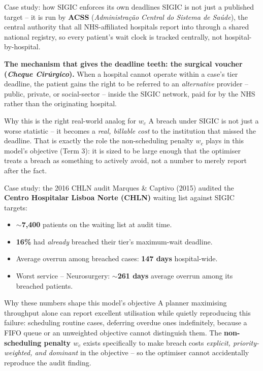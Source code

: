 \documentclass[10pt,aspectratio=169]{beamer}
\begin{document}
\begin{frame}{Case study: how SIGIC enforces its own deadlines}
  SIGIC is not just a published target -- it is run by \textbf{ACSS}
  (\emph{Administra\c{c}\~ao Central do Sistema de Sa\'ude}), the central
  authority that all NHS-affiliated hospitals report into through a shared
  national registry, so every patient's wait clock is tracked centrally,
  not hospital-by-hospital.

  \vspace{0.4em}
  \textbf{The mechanism that gives the deadline teeth: the surgical
  voucher (\emph{Cheque Cirúrgico}).} When a hospital cannot operate
  within a case's tier deadline, the patient gains the right to be
  referred to an \emph{alternative} provider -- public, private, or
  social-sector -- inside the SIGIC network, paid for by the NHS rather
  than the originating hospital.

  \pause
  \begin{block}{Why this is the right real-world analog for $w_c$}
    A breach under SIGIC is not just a worse statistic -- it becomes a
    \emph{real, billable cost} to the institution that missed the
    deadline. That is exactly the role the non-scheduling penalty $w_c$
    plays in this model's objective (Term 3): it is sized to be large
    enough that the optimiser treats a breach as something to actively
    avoid, not a number to merely report after the fact.
  \end{block}
\end{frame}

\begin{frame}{Case study: the 2016 CHLN audit}
  Marques \& Captivo (2015) audited the \textbf{Centro Hospitalar Lisboa
  Norte (CHLN)} waiting list against SIGIC targets:
  \begin{itemize}\small
    \item $\sim$\textbf{7{,}400} patients on the waiting list at audit time.
    \item \textbf{16\%} had \emph{already} breached their tier's maximum-wait
      deadline.
    \item Average overrun among breached cases: \textbf{147 days}
      hospital-wide.
    \item Worst service -- Neurosurgery: $\sim$\textbf{261 days} average
      overrun among its breached patients.
  \end{itemize}
  \pause
  \begin{block}{Why these numbers shape this model's objective}
    A planner maximising throughput alone can report excellent utilisation
    while quietly reproducing this failure: scheduling routine cases,
    deferring overdue ones indefinitely, because a FIFO queue or an
    unweighted objective cannot distinguish them.
    The \textbf{non-scheduling penalty $w_c$} exists specifically to make
    breach costs \emph{explicit, priority-weighted, and dominant} in the
    objective -- so the optimiser cannot accidentally reproduce the audit
    finding.
  \end{block}
\end{frame}
\end{document}
